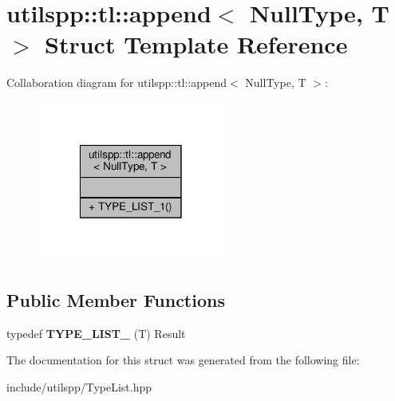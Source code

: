 \hypertarget{structutilspp_1_1tl_1_1append_3_01NullType_00_01T_01_4}{\section{utilspp\-:\-:tl\-:\-:append$<$ Null\-Type, T $>$ Struct Template Reference}
\label{structutilspp_1_1tl_1_1append_3_01NullType_00_01T_01_4}
}


Collaboration diagram for utilspp\-:\-:tl\-:\-:append$<$ Null\-Type, T $>$\-:
\nopagebreak
\begin{figure}[H]
\begin{center}
\leavevmode
\includegraphics[width=174pt]{structutilspp_1_1tl_1_1append_3_01NullType_00_01T_01_4__coll__graph}
\end{center}
\end{figure}
\subsection*{Public Member Functions}
\begin{DoxyCompactItemize}
\item 
\hypertarget{structutilspp_1_1tl_1_1append_3_01NullType_00_01T_01_4_ac1e8e195f13a135885e3fdbcaf2dad96}{typedef {\bfseries T\-Y\-P\-E\-\_\-\-L\-I\-S\-T\-\_} (T) Result}\label{structutilspp_1_1tl_1_1append_3_01NullType_00_01T_01_4_ac1e8e195f13a135885e3fdbcaf2dad96}

\end{DoxyCompactItemize}


The documentation for this struct was generated from the following file\-:\begin{DoxyCompactItemize}
\item 
include/utilspp/Type\-List.\-hpp\end{DoxyCompactItemize}
